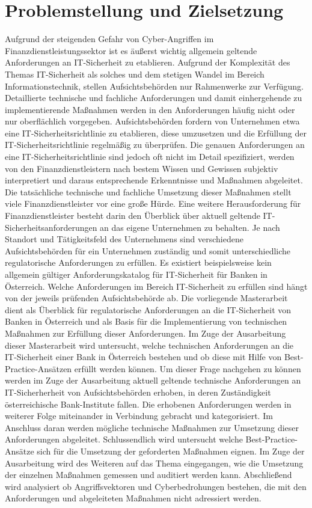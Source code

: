 \section{Problemstellung und Zielsetzung}
\label{cha:zielsetzung}
Aufgrund der steigenden Gefahr von Cyber-Angriffen im Finanzdienstleistungssektor ist es äußerst wichtig allgemein geltende Anforderungen an IT-Sicherheit zu etablieren. Aufgrund der Komplexität des Themas IT-Sicherheit als solches und dem stetigen Wandel im Bereich Informationstechnik, stellen Aufsichtsbehörden nur Rahmenwerke zur Verfügung. Detaillierte technische und fachliche Anforderungen und damit einhergehende zu implementierende Maßnahmen werden in den Anforderungen häufig nicht oder nur oberflächlich vorgegeben. Aufsichtsbehörden fordern von Unternehmen etwa eine IT-Sicherheitsrichtlinie zu etablieren, diese umzusetzen und die Erfüllung der IT-Sicherheitsrichtlinie regelmäßig zu überprüfen. Die genauen Anforderungen an eine IT-Sicherheitsrichtlinie sind jedoch oft nicht im Detail spezifiziert, werden von den Finanzdienstleistern nach bestem Wissen und Gewissen subjektiv interpretiert und daraus entsprechende Erkenntnisse und Maßnahmen abgeleitet. Die tatsächliche technische und fachliche Umsetzung dieser Maßnahmen stellt viele Finanzdienstleister vor eine große Hürde. Eine weitere Herausforderung für Finanzdienstleister besteht darin den Überblick über aktuell geltende IT-Sicherheitsanforderungen an das eigene Unternehmen zu behalten. Je nach Standort und Tätigkeitsfeld des Unternehmens sind verschiedene Aufsichtsbehörden für ein Unternehmen zuständig und somit unterschiedliche regulatorische Anforderungen zu erfüllen. Es existiert beispielsweise kein allgemein gültiger Anforderungskatalog für IT-Sicherheit für Banken in Österreich. Welche Anforderungen im Bereich IT-Sicherheit zu erfüllen sind hängt von der jeweils prüfenden Aufsichtsbehörde ab.
\bigbreak
Die vorliegende Masterarbeit dient als Überblick für regulatorische Anforderungen an die IT-Sicherheit von Banken in Österreich und als Basis für die Implementierung von technischen Maßnahmen zur Erfüllung dieser Anforderungen. Im Zuge der Ausarbeitung dieser Masterarbeit wird untersucht, welche technischen Anforderungen an die IT-Sicherheit einer Bank in Österreich bestehen und ob diese mit Hilfe von Best-Practice-Ansätzen erfüllt werden können. Um dieser Frage nachgehen zu können werden im Zuge der Ausarbeitung aktuell geltende technische Anforderungen an IT-Sicherherheit von Aufsichtsbehörden erhoben, in deren Zuständigkeit österreichische Bank-Institute fallen. Die erhobenen Anforderungen werden in weiterer Folge miteinander in Verbindung gebracht und kategorisiert. Im Anschluss daran werden mögliche technische Maßnahmen zur Umsetzung dieser Anforderungen abgeleitet. Schlussendlich wird untersucht welche Best-Practice-Ansätze sich für die Umsetzung der geforderten Maßnahmen eignen. Im Zuge der Ausarbeitung wird des Weiteren auf das Thema eingegangen, wie die Umsetzung der einzelnen Maßnahmen gemessen und auditiert werden kann. Abschließend wird analysiert ob Angriffsvektoren und Cyberbedrohungen bestehen, die mit den Anforderungen und abgeleiteten Maßnahmen nicht adressiert werden. 
